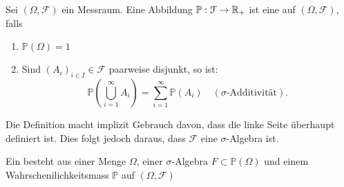 \begin{definition}[Wahrscheinlichkeitsverteilung]\label{def:wahrscheinlichkeitsverteilung}
Sei $(\Omega, \mathcal{F})$ ein Messraum. Eine Abbildung $\mathbb{P} : \mathcal{F} \to  \mathbb{R}_+$ ist eine  auf $(\Omega, \mathcal{F})$, falls
    \begin{enumerate}[(1)]
        \item $\mathbb{P}(\Omega) = 1$
        \item Sind $(A_i)_{i \in I}\in \mathcal{F}$ paarweise disjunkt, so ist:
            \[
                \mathbb{P}\left( \bigcup_{i=1}^{\infty}A_i \right) = \sum_{i=1}^{\infty} \mathbb{P}(A_i) \quad (\sigma\text{-Additivität})
            .\] 
    \end{enumerate}
\end{definition}
\begin{remark*}
    Die Definition macht implizit Gebrauch davon, dass die linke Seite überhaupt definiert ist. Dies folgt jedoch daraus, dass $\mathcal{F}$ eine $\sigma$-Algebra ist.
\end{remark*}

\begin{definition}[Wahrscheinlichkeitsraum]\label{def:wahrscheinlichkeitsraum}
    Ein  besteht aus einer Menge $\Omega$, einer  $\sigma$-Algebra $F\subset \mathbb{P}\mathcal{(\Omega)}$ und einem Wahrschenilichkeitsmass $\mathbb{P}$ auf $(\Omega, \mathcal{F})$ 
\end{definition}


